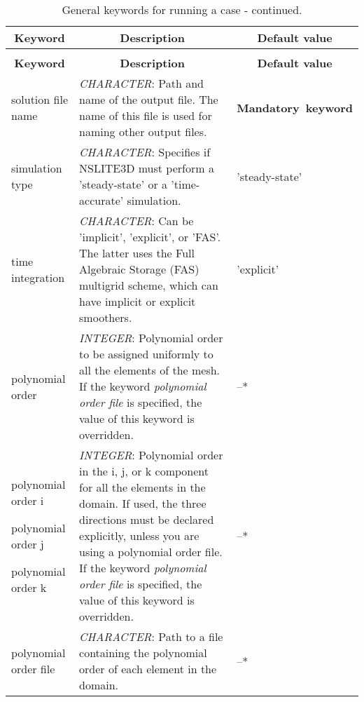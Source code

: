 \documentclass[a4paper,10pt]{report}
\begin{document}
\begin{longtable}{|p{4cm}|p{10cm}|p{2.2cm}|}
\caption{General keywords for running a case.} \label{tab:runningkey} \\
\hline
\multicolumn{1}{|c|}{\textbf{Keyword}} & \multicolumn{1}{c|}{\textbf{Description}} & \multicolumn{1}{c|}{\textbf{Default value}} \\ \hline
\endfirsthead

\caption{General keywords for running a case - continued.} \\
\hline
\multicolumn{1}{|c|}{\textbf{Keyword}} & \multicolumn{1}{c|}{\textbf{Description}} & \multicolumn{1}{c|}{\textbf{Default value}} \\ \hline
\endhead

solution file name   & \textit{CHARACTER}: Path and name of the output file. The name of this file is used for naming other output files. & \textbf{Mandatory\ keyword} \\ \hline

simulation type        & \textit{CHARACTER}: Specifies if NSLITE3D must perform a 'steady-state' or a 'time-accurate' simulation. &  'steady-state'\\ \hline

time integration & \textit{CHARACTER}: Can be 'implicit', 'explicit', or 'FAS'. The latter uses the Full Algebraic Storage (FAS) multigrid scheme, which can have implicit or explicit smoothers. & 'explicit' \\ \hline

polynomial order   & \textit{INTEGER}: Polynomial order to be assigned uniformly to all the elements of the mesh. If the keyword \textit{polynomial order file} is specified, the value of this keyword is overridden. & --* \\ \hline

polynomial order i \

polynomial order j \

polynomial order k & \textit{INTEGER}: Polynomial order in the i, j, or k component for all the elements in the domain. If used, the three directions must be declared explicitly, unless you are using a polynomial order file. If the keyword \textit{polynomial order file} is specified, the value of this keyword is overridden. & --* \\ \hline

polynomial order file  & \textit{CHARACTER}: Path to a file containing the polynomial order of each element in the domain. & --* \\ \hline


\end{longtable}
\end{document}
